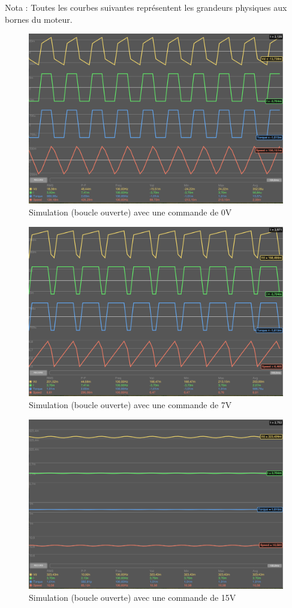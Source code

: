 \documentclass[a4paper]{article}
\begin{document}
Nota : Toutes les courbes suivantes représentent les grandeurs physiques aux bornes du moteur.

\begin{figure}[H]
	\centering
	\includegraphics[width=1\textwidth]{simu0v}
	\caption{Simulation (boucle ouverte) avec une commande de 0V}
\end{figure}
\begin{figure}[H]
	\centering
	\includegraphics[width=1\textwidth]{simu7v}
	\caption{Simulation (boucle ouverte) avec une commande de 7V}
\end{figure}
\begin{figure}[H]
	\centering
	\includegraphics[width=1\textwidth]{simu15v}
	\caption{Simulation (boucle ouverte) avec une commande de 15V}
\end{figure}
\end{document}
